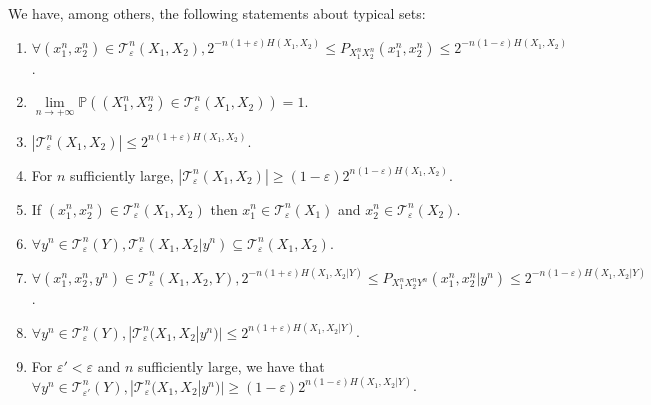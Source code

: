      \begin{lemma}
        We have, among others, the following statements about typical sets:
        \begin{enumerate}
        \item $\forall (x_1^n,x_2^n) \in \mathcal{T}^n_{\varepsilon}(X_1,X_2), 2^{-n(1+\varepsilon)H(X_1,X_2)} \leq P_{X_1^nX_2^n}(x_1^n,x_2^n) \leq 2^{-n(1-\varepsilon)H(X_1,X_2)}$.
        \item $\underset{n \rightarrow +\infty}{\lim} \mathbb{P}\left((X_1^n,X_2^n) \in \mathcal{T}^n_{\varepsilon}(X_1,X_2) \right) = 1$.
        \item $|\mathcal{T}^n_{\varepsilon}(X_1,X_2)| \leq 2^{n(1+\varepsilon)H(X_1,X_2)}$.
        \item For $n$ sufficiently large, $|\mathcal{T}^n_{\varepsilon}(X_1,X_2)| \geq (1-\varepsilon)2^{n(1-\varepsilon)H(X_1,X_2)}$.
        \item If $(x_1^n,x_2^n) \in \mathcal{T}^n_{\varepsilon}(X_1,X_2)$ then $x_1^n \in \mathcal{T}^n_{\varepsilon}(X_1)$ and $x_2^n \in \mathcal{T}^n_{\varepsilon}(X_2)$.
        \item $\forall y^n \in \mathcal{T}^n_{\varepsilon}(Y), \mathcal{T}^n_{\varepsilon}(X_1,X_2|y^n) \subseteq \mathcal{T}^n_{\varepsilon}(X_1,X_2)$.
        \item $\forall (x_1^n,x_2^n,y^n) \in \mathcal{T}^n_{\varepsilon}(X_1,X_2,Y), 2^{-n(1+\varepsilon)H(X_1,X_2|Y)} \leq P_{X_1^nX_2^nY^n}(x_1^n,x_2^n|y^n) \leq 2^{-n(1-\varepsilon)H(X_1,X_2|Y)}$.
        \item $\forall y^n \in \mathcal{T}^n_{\varepsilon}(Y), |\mathcal{T}^n_{\varepsilon}(X_1,X_2|y^n)| \leq 2^{n(1+\varepsilon)H(X_1,X_2|Y)}$.
        \item For $\varepsilon' < \varepsilon$ and $n$ sufficiently large, we have that $\forall y^n \in \mathcal{T}^n_{\varepsilon'}(Y), |\mathcal{T}^n_{\varepsilon}(X_1,X_2|y^n)| \geq (1-\varepsilon)2^{n(1-\varepsilon)H(X_1,X_2|Y)}$.
        \end{enumerate}
      \end{lemma}
